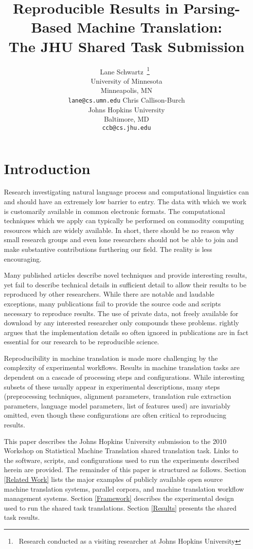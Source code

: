 \documentclass[11pt]{article}
\title{Reproducible Results in Parsing-Based Machine Translation:\\
The JHU Shared Task Submission}
\author{Lane Schwartz\
\thanks{\ Research conducted as a visiting researcher at Johns Hopkins University}\
\\University of Minnesota\\Minneapolis, MN\\
{\tt lane@cs.umn.edu} \And
Chris Callison-Burch \\
Johns Hopkins University \\
Baltimore, MD\\
{\tt ccb@cs.jhu.edu}}
\date{}
\begin{document}
\maketitle

\begin{abstract}
\end{abstract}


\section{Introduction}


Research investigating natural language process and computational linguistics can and should have an extremely low barrier to entry. The data with which we work is customarily available in common electronic formats. The computational techniques which we apply can typically be performed on commodity computing resources which are widely available. In short, there should be no reason why small research groups and even lone researchers should not be able to join and make substantive contributions furthering our field.
%
The reality is less encouraging. 

Many published articles describe novel techniques and provide interesting results, yet fail to describe technical details in sufficient detail to allow their results to be reproduced by other researchers. While there are notable and laudable exceptions, many publications fail to provide the source code and scripts necessary to reproduce results. The use of private data, not freely available for download by any interested researcher only compounds these problems.  rightly argues that the implementation details so often ignored in publications are in fact essential for our research to be reproducible science.

Reproducibility in machine translation is made more challenging by the complexity of experimental workflows. Results in machine translation tasks are dependent on a cascade of processing steps and configurations. While interesting subsets of these usually appear in experimental descriptions, many steps (preprocessing techniques, alignment parameters, translation rule extraction parameters, language model parameters, list of features used) are invariably omitted, even though these configurations are often critical to reproducing results.

This paper describes the Johns Hopkins University submission to the 2010 Workshop on Statistical Machine Translation shared translation task. Links to the software, scripts, and configurations used to run the experiments described herein are provided. The remainder of this paper is structured as follows. Section \ref{Related Work} lists the major examples of publicly available open source machine translation systems, parallel corpora, and machine translation workflow management systems. Section \ref{Framework} describes the experimental design used to run the shared task translations. Section \ref{Results} presents the shared task results.
\end{document}
